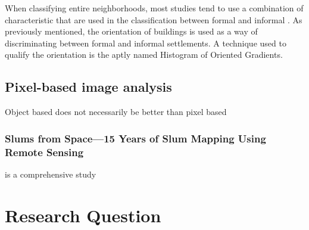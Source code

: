 \documentclass{article}
\begin{document}

When classifying entire neighborhoods, most studies tend to use a combination
of characteristic that are used in the classification between formal and
informal \cite{graesser2012image}. As previously mentioned, the orientation of
buildings is used as a way of discriminating between formal and informal
settlements. A technique used to qualify the orientation is the aptly named Histogram of
Oriented Gradients.




\subsection{Pixel-based image analysis} Object based does not necessarily be
better than pixel based 

\subsubsection*{Slums from Space—15 Years of Slum Mapping Using Remote Sensing}
\cite{blaschke2014geographic}
\cite{bian2007object}

\cite{kuffer2016slums} is a comprehensive study

\section{Research Question}

\nocite{*}
\printbibliography
\end{document}
